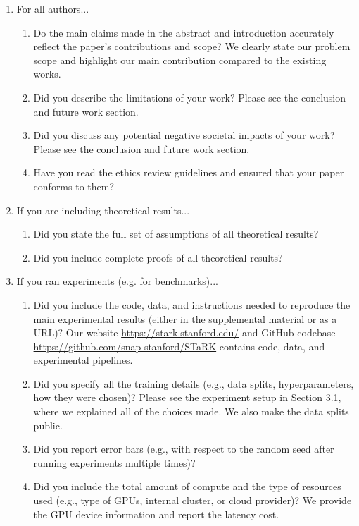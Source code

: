 \documentclass{article}
\begin{document}
\begin{enumerate}

\item For all authors...
\begin{enumerate}
  \item Do the main claims made in the abstract and introduction accurately reflect the paper's contributions and scope?
    \answerYes{} We clearly state our problem scope and highlight our main contribution compared to the existing works.
  \item Did you describe the limitations of your work?
    \answerYes{} Please see the conclusion and future work section.
  \item Did you discuss any potential negative societal impacts of your work?
    \answerYes{} Please see the conclusion and future work section.
  \item Have you read the ethics review guidelines and ensured that your paper conforms to them?
    \answerYes{}
\end{enumerate}

\item If you are including theoretical results...
\begin{enumerate}
  \item Did you state the full set of assumptions of all theoretical results?
    \answerNA{}
	\item Did you include complete proofs of all theoretical results?
    \answerNA{}
\end{enumerate}

\item If you ran experiments (e.g. for benchmarks)...
\begin{enumerate}
  \item Did you include the code, data, and instructions needed to reproduce the main experimental results (either in the supplemental material or as a URL)?
    \answerYes{} Our website {\textcolor{cyan}{\url{https://stark.stanford.edu/}}} and GitHub codebase {\textcolor{cyan}{\url{https://github.com/snap-stanford/STaRK}}} contains code, data, and experimental pipelines.
  \item Did you specify all the training details (e.g., data splits, hyperparameters, how they were chosen)?
    \answerYes{} Please see the experiment setup in Section 3.1, where we explained all of the choices made. We also make the data splits public.
	\item Did you report error bars (e.g., with respect to the random seed after running experiments multiple times)?
    \answerNA{}
	\item Did you include the total amount of compute and the type of resources used (e.g., type of GPUs, internal cluster, or cloud provider)?
    \answerYes{} We provide the GPU device information and report the latency cost.
\end{enumerate}


\end{enumerate}
\end{document}
